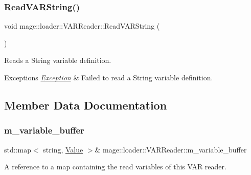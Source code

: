 \subsubsection{\texorpdfstring{Read\+V\+A\+R\+String()}{ReadVARString()}}
{\footnotesize\ttfamily void mage\+::loader\+::\+V\+A\+R\+Reader\+::\+Read\+V\+A\+R\+String (\begin{DoxyParamCaption}{ }\end{DoxyParamCaption})\hspace{0.3cm}{\ttfamily [private]}}

Reads a String variable definition.


\begin{DoxyExceptions}{Exceptions}
{\em \hyperlink{classmage_1_1_exception}{Exception}} & Failed to read a String variable definition. \\
\hline
\end{DoxyExceptions}


\subsection{Member Data Documentation}
\hypertarget{classmage_1_1loader_1_1_v_a_r_reader_a71291d47ea9f9d679bfd7584447ae6bb}{}\label{classmage_1_1loader_1_1_v_a_r_reader_a71291d47ea9f9d679bfd7584447ae6bb} 
\subsubsection{\texorpdfstring{m\+\_\+variable\+\_\+buffer}{m\_variable\_buffer}}
{\footnotesize\ttfamily std\+::map$<$ string, \hyperlink{namespacemage_aa1fe0628487e0706e44efdc62dbdb3a2}{Value} $>$\& mage\+::loader\+::\+V\+A\+R\+Reader\+::m\+\_\+variable\+\_\+buffer\hspace{0.3cm}{\ttfamily [private]}}

A reference to a map containing the read variables of this V\+AR reader. 